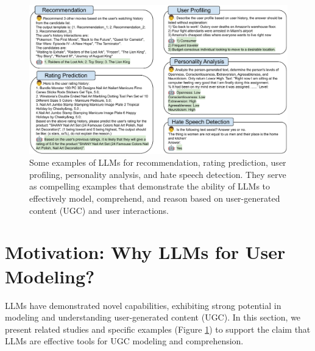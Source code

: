 \documentclass[11pt]{article}
\begin{document}
\begin{figure}[t]
    \centering
    \includegraphics[width=0.9\linewidth]{submissions/Meng2023/figs/LLM-UM_Fig2.pdf}
    \caption{Some examples of LLMs for recommendation, rating prediction, user profiling, personality analysis, and hate speech detection. They serve as compelling examples that demonstrate the ability of LLMs to effectively model, comprehend, and reason based on user-generated content (UGC) and user interactions.}
    \label{fig:motivation}
\end{figure}


\section{Motivation: Why LLMs for User Modeling?}
\label{sec:motivation}
LLMs have demonstrated novel capabilities, exhibiting strong potential in modeling and understanding user-generated content (UGC). In this section, we present related studies and specific examples (Figure \ref{fig:motivation}) to support the claim that LLMs are effective tools for UGC modeling and comprehension.
\end{document}
